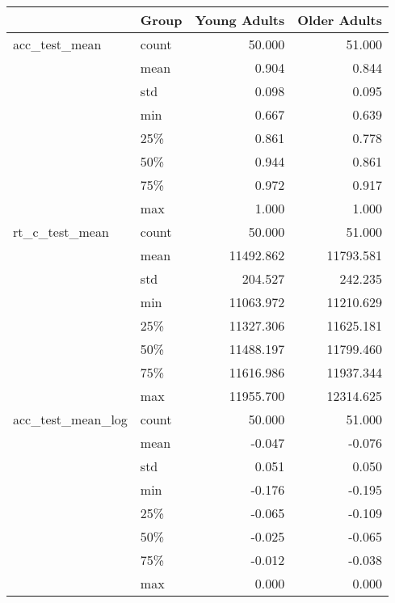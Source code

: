 \begin{tabular}{llrr}
\toprule
                  & Group &  Young Adults &  Older Adults \\
\midrule
acc\_test\_mean & count &        50.000 &        51.000 \\
                  & mean &         0.904 &         0.844 \\
                  & std &         0.098 &         0.095 \\
                  & min &         0.667 &         0.639 \\
                  & 25\% &         0.861 &         0.778 \\
                  & 50\% &         0.944 &         0.861 \\
                  & 75\% &         0.972 &         0.917 \\
                  & max &         1.000 &         1.000 \\
rt\_c\_test\_mean & count &        50.000 &        51.000 \\
                  & mean &     11492.862 &     11793.581 \\
                  & std &       204.527 &       242.235 \\
                  & min &     11063.972 &     11210.629 \\
                  & 25\% &     11327.306 &     11625.181 \\
                  & 50\% &     11488.197 &     11799.460 \\
                  & 75\% &     11616.986 &     11937.344 \\
                  & max &     11955.700 &     12314.625 \\
acc\_test\_mean\_log & count &        50.000 &        51.000 \\
                  & mean &        -0.047 &        -0.076 \\
                  & std &         0.051 &         0.050 \\
                  & min &        -0.176 &        -0.195 \\
                  & 25\% &        -0.065 &        -0.109 \\
                  & 50\% &        -0.025 &        -0.065 \\
                  & 75\% &        -0.012 &        -0.038 \\
                  & max &         0.000 &         0.000 \\
\bottomrule
\end{tabular}
